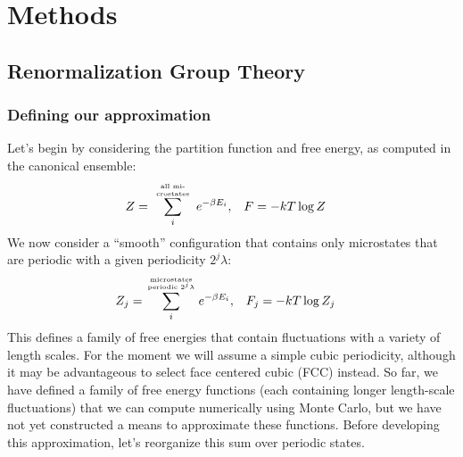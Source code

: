 \documentclass[letterpaper,twocolumn,amsmath,amssymb,pre,aps,10pt]{revtex4-1}
\begin{document}
\section{Methods}

\subsection{Renormalization Group Theory}

\subsubsection{Defining our approximation}
Let's begin by considering the partition function and free energy, as
computed in the canonical ensemble:
\begin{align}
  Z &= \sum_i^{\text{\tiny\begin{minipage}{5em}
      \begin{center}
        \tiny all microstates\end{center}\end{minipage}}}
       e^{-\beta E_i}, & F &= -kT\log Z
\end{align}
We now consider a ``smooth'' configuration that contains only
microstates that are periodic with a given periodicity $2^j\lambda$:
\newcommand\sumstatesperiodic[1]{\sum_i^{\text{\tiny\begin{minipage}{6em}
      \begin{center}
        \tiny microstates periodic $#1$\end{center}\end{minipage}}}}
\begin{align}
  Z_j &= \sumstatesperiodic{2^j\lambda}
       e^{-\beta E_i}, & F_j &= -kT\log Z_j
       \label{eq:Zn}
\end{align}
This defines a family of free energies that contain fluctuations with
a variety of length scales.  For the moment we will assume a simple
cubic periodicity, although it may be advantageous to select face
centered cubic (FCC) instead.  So far, we have defined a family of
free energy functions (each containing longer length-scale
fluctuations) that we can compute numerically using Monte Carlo, but
we have not yet constructed a means to approximate these functions.
Before developing this approximation, let's reorganize this sum over
periodic states.
\newcommand\sumoccupanciesofoctants{
  \sum_{N_1\cdots N_8}^{\text{\tiny\begin{minipage}{5em}
      \begin{center}
      \tiny numbers in octants\end{center}\end{minipage}}}
}
\end{document}
